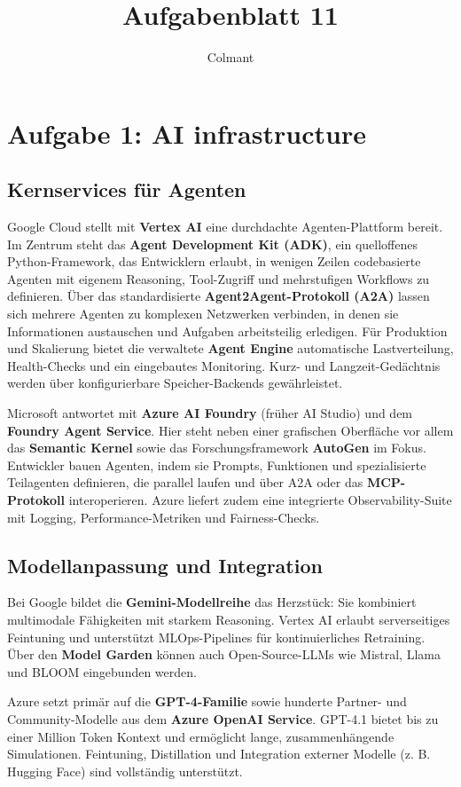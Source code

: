 \documentclass[a4paper,12pt]{scrartcl}
\title{Aufgabenblatt 11}
\begin{document}
\author{Colmant}
\maketitle
\newpage
\section*{Aufgabe 1: AI infrastructure}
\subsection*{Kernservices für Agenten}
Google Cloud stellt mit \textbf{Vertex AI} eine durchdachte Agenten-Plattform bereit. Im Zentrum steht das \textbf{Agent Development Kit (ADK)}, ein quelloffenes Python-Framework, das Entwicklern erlaubt, in wenigen Zeilen codebasierte Agenten mit eigenem Reasoning, Tool-Zugriff und mehrstufigen Workflows zu definieren. Über das standardisierte \textbf{Agent2Agent-Protokoll (A2A)} lassen sich mehrere Agenten zu komplexen Netzwerken verbinden, in denen sie Informationen austauschen und Aufgaben arbeitsteilig erledigen. Für Produktion und Skalierung bietet die verwaltete \textbf{Agent Engine} automatische Lastverteilung, Health-Checks und ein eingebautes Monitoring. Kurz- und Langzeit-Gedächtnis werden über konfigurierbare Speicher-Backends gewährleistet.

Microsoft antwortet mit \textbf{Azure AI Foundry} (früher AI Studio) und dem \textbf{Foundry Agent Service}. Hier steht neben einer grafischen Oberfläche vor allem das \textbf{Semantic Kernel} sowie das Forschungsframework \textbf{AutoGen} im Fokus. Entwickler bauen Agenten, indem sie Prompts, Funktionen und spezialisierte Teilagenten definieren, die parallel laufen und über A2A oder das \textbf{MCP-Protokoll} interoperieren. Azure liefert zudem eine integrierte Observability-Suite mit Logging, Performance-Metriken und Fairness-Checks.

\subsection*{Modellanpassung und Integration}
Bei Google bildet die \textbf{Gemini-Modellreihe} das Herzstück: Sie kombiniert multimodale Fähigkeiten mit starkem Reasoning. Vertex AI erlaubt serverseitiges Feintuning und unterstützt MLOps-Pipelines für kontinuierliches Retraining. Über den \textbf{Model Garden} können auch Open-Source-LLMs wie Mistral, Llama und BLOOM eingebunden werden.

Azure setzt primär auf die \textbf{GPT-4-Familie} sowie hunderte Partner- und Community-Modelle aus dem \textbf{Azure OpenAI Service}. GPT-4.1 bietet bis zu einer Million Token Kontext und ermöglicht lange, zusammenhängende Simulationen. Feintuning, Distillation und Integration externer Modelle (z. B. Hugging Face) sind vollständig unterstützt.
\end{document}
